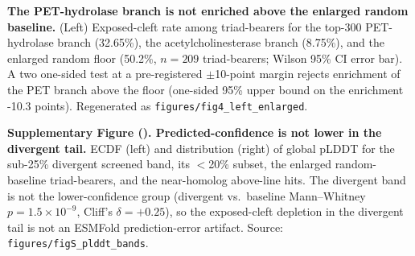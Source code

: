 \textbf{The PET-hydrolase branch is not enriched above the enlarged random baseline.}
(Left) Exposed-cleft rate among triad-bearers for the top-300 PET-hydrolase branch
(32.65\%), the acetylcholinesterase branch (8.75\%), and the enlarged random floor
(50.2\%, $n=209$ triad-bearers; Wilson 95\% CI error bar). A two
one-sided test at a pre-registered $\pm$10-point margin rejects enrichment of
the PET branch above the floor (one-sided 95\% upper bound on the enrichment
-10.3 points). Regenerated as \texttt{figures/fig4\_left\_enlarged}.

\textbf{Supplementary Figure (\label{figS_plddt}). Predicted-confidence is not lower in
the divergent tail.} ECDF (left) and distribution (right) of global pLDDT for the
sub-25\% divergent screened band, its $<$20\% subset, the enlarged random-baseline
triad-bearers, and the near-homolog above-line hits. The divergent band is not the
lower-confidence group (divergent vs.\ baseline Mann--Whitney $p=1.5\times10^{-9}$,
Cliff's $\delta=+0.25$), so the exposed-cleft depletion in the divergent
tail is not an ESMFold prediction-error artifact. Source:
\texttt{figures/figS\_plddt\_bands}.
